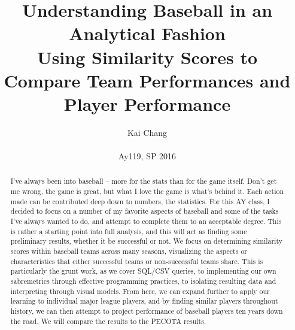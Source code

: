 \documentclass[12pt]{article}
\numberwithin{equation}{subsection}
\begin{document}
 
\onehalfspacing %

\title{Understanding Baseball in an Analytical Fashion \\
Using Similarity Scores to Compare Team Performances and Player Performance}%
\author{Kai Chang\\ \\%
Ay119, SP 2016} %
 
\maketitle

\pagebreak

\begin{abstract}
\noindent I've always been into baseball -- more for the stats than for the game itself. Don't get me wrong, the game is great, but what I love the game is what's behind it. Each action made can be contributed deep down to numbers, the statistics. For this AY class, I decided to focus on a number of my favorite aspects of baseball and some of the tasks I've always wanted to do, and attempt to complete them to an acceptable degree. This is rather a starting point into full analysis, and this will act as finding some preliminary results, whether it be successful or not. We focus on determining similarity scores within baseball teams across many seasons, visualizing the aspects or characteristics that either successful teams or non-successful teams share. This is particularly the grunt work, as we cover SQL/CSV queries, to implementing our own sabremetrics through effective programming practices, to isolating resulting data and interpreting through visual models. From here, we can expand further to apply our learning to individual major league players, and by finding similar players throughout history, we can then attempt to project performance of baseball players ten years down the road. We will compare the results to the PECOTA results.
\end{abstract}

\pagebreak

\tableofcontents
\lstlistoflistings

\pagebreak
\end{document}
